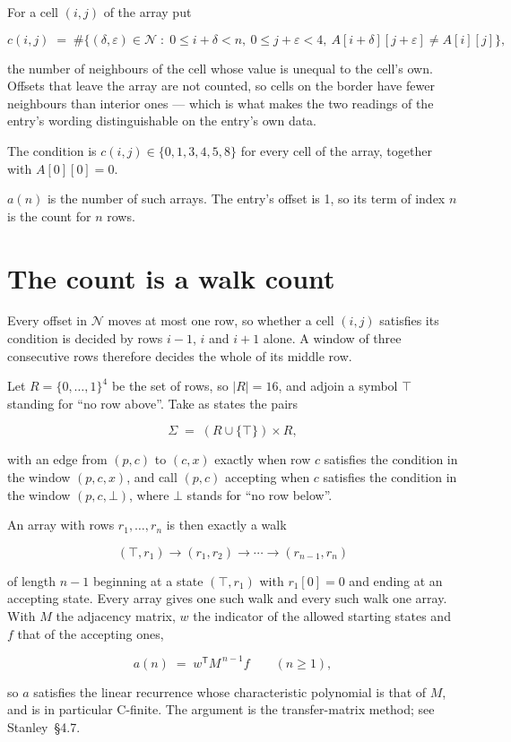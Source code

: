 \documentclass[11pt]{article}
\theoremstyle{definition}
\begin{document}
For a cell $(i,j)$ of the array put

\[c(i,j) \;=\; \#\bigl\{(\delta,\varepsilon)\in\mathcal{N} \;:\; 0\le i+\delta<n,\ 0\le j+\varepsilon<4,\ A[i+\delta][j+\varepsilon] \neq A[i][j]\bigr\},\]

the number of neighbours of the cell whose value is unequal to the cell's own. Offsets that leave the array are not counted, so cells on the border have fewer neighbours than interior ones --- which is what makes the two readings of the entry's wording distinguishable on the entry's own data.

The condition is $c(i,j) \in \{0, 1, 3, 4, 5, 8\}$ for every cell of the array, together with $A[0][0]=0$.

$a(n)$ is the number of such arrays. The entry's offset is 1, so its term of index $n$ is the count for $n$ rows.

\section{The count is a walk count}

Every offset in $\mathcal{N}$ moves at most one row, so whether a cell $(i,j)$ satisfies its condition is decided by rows $i-1$, $i$ and $i+1$ alone. A window of three consecutive rows therefore decides the whole of its middle row.

Let $R = \{0,\dots,1\}^{4}$ be the set of rows, so $|R| = 16$, and adjoin a symbol $\top$ standing for ``no row above''. Take as states the pairs

\[\Sigma \;=\; (R \cup \{\top\}) \times R,\]

with an edge from $(p,c)$ to $(c,x)$ exactly when row $c$ satisfies the condition in the window $(p,c,x)$, and call $(p,c)$ accepting when $c$ satisfies the condition in the window $(p,c,\bot)$, where $\bot$ stands for ``no row below''.

An array with rows $r_1,\dots,r_n$ is then exactly a walk

\[(\top,r_1) \to (r_1,r_2) \to \cdots \to (r_{n-1},r_n)\]

of length $n-1$ beginning at a state $(\top,r_1)$ with $r_1[0]=0$ and ending at an accepting state. Every array gives one such walk and every such walk one array. With $M$ the adjacency matrix, $w$ the indicator of the allowed starting states and $f$ that of the accepting ones,

\[a(n) \;=\; w^{\mathsf T} M^{\,n-1} f \qquad (n \ge 1),\]

so $a$ satisfies the linear recurrence whose characteristic polynomial is that of $M$, and is in particular C-finite. The argument is the transfer-matrix method; see Stanley~\S4.7.
\end{document}
